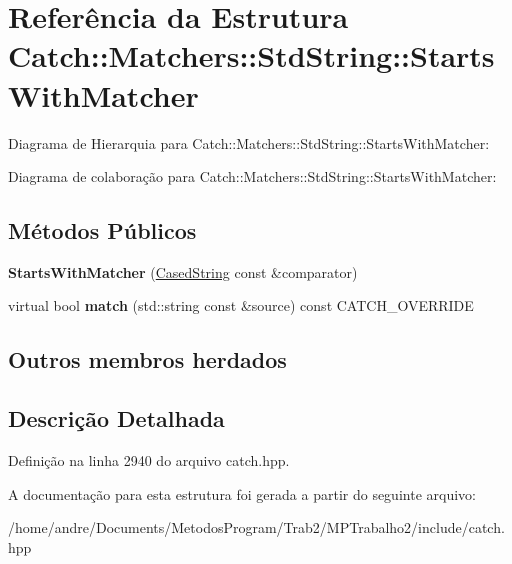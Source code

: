\hypertarget{structCatch_1_1Matchers_1_1StdString_1_1StartsWithMatcher}{}\section{Referência da Estrutura Catch\+:\+:Matchers\+:\+:Std\+String\+:\+:Starts\+With\+Matcher}
\label{structCatch_1_1Matchers_1_1StdString_1_1StartsWithMatcher}


Diagrama de Hierarquia para Catch\+:\+:Matchers\+:\+:Std\+String\+:\+:Starts\+With\+Matcher\+:


Diagrama de colaboração para Catch\+:\+:Matchers\+:\+:Std\+String\+:\+:Starts\+With\+Matcher\+:
\subsection*{Métodos Públicos}
\begin{DoxyCompactItemize}
\item 
{\bfseries Starts\+With\+Matcher} (\hyperlink{structCatch_1_1Matchers_1_1StdString_1_1CasedString}{Cased\+String} const \&comparator)\hypertarget{structCatch_1_1Matchers_1_1StdString_1_1StartsWithMatcher_a7b86f258bdbd131a6e7bcd94a8977325}{}\label{structCatch_1_1Matchers_1_1StdString_1_1StartsWithMatcher_a7b86f258bdbd131a6e7bcd94a8977325}

\item 
virtual bool {\bfseries match} (std\+::string const \&source) const C\+A\+T\+C\+H\+\_\+\+O\+V\+E\+R\+R\+I\+DE\hypertarget{structCatch_1_1Matchers_1_1StdString_1_1StartsWithMatcher_a0d37b1ddba7f1031e360ccd475f05d0d}{}\label{structCatch_1_1Matchers_1_1StdString_1_1StartsWithMatcher_a0d37b1ddba7f1031e360ccd475f05d0d}

\end{DoxyCompactItemize}
\subsection*{Outros membros herdados}


\subsection{Descrição Detalhada}


Definição na linha 2940 do arquivo catch.\+hpp.



A documentação para esta estrutura foi gerada a partir do seguinte arquivo\+:\begin{DoxyCompactItemize}
\item 
/home/andre/\+Documents/\+Metodos\+Program/\+Trab2/\+M\+P\+Trabalho2/include/catch.\+hpp\end{DoxyCompactItemize}
